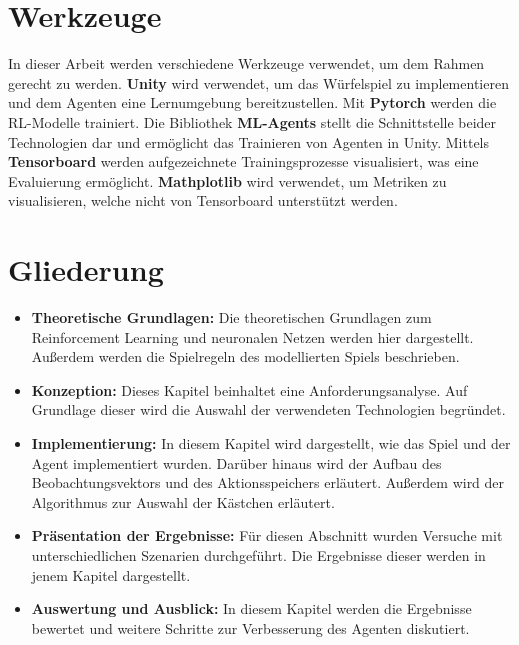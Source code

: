 \section{Werkzeuge}
In dieser Arbeit werden verschiedene Werkzeuge verwendet, um dem Rahmen gerecht zu werden.
\textbf{Unity} wird verwendet, um das Würfelspiel zu implementieren und dem Agenten eine Lernumgebung bereitzustellen. Mit \textbf{Pytorch} werden die RL-Modelle trainiert. Die Bibliothek \textbf  {ML-Agents} stellt die Schnittstelle beider Technologien dar und ermöglicht das Trainieren von Agenten in Unity. Mittels \textbf{Tensorboard} werden aufgezeichnete Trainingsprozesse visualisiert, was eine Evaluierung ermöglicht. \textbf{Mathplotlib} wird verwendet, um Metriken zu visualisieren, welche nicht von Tensorboard unterstützt werden.

\section{Gliederung}
\begin{itemize}[noitemsep]
\item \textbf{Theoretische Grundlagen:} Die theoretischen Grundlagen zum Reinforcement Learning und neuronalen Netzen werden hier dargestellt. Außerdem werden die Spielregeln des modellierten Spiels beschrieben.
\item \textbf{Konzeption:} Dieses Kapitel beinhaltet eine Anforderungsanalyse. Auf Grundlage dieser wird die Auswahl der verwendeten Technologien begründet.
\item \textbf{Implementierung:} In diesem Kapitel wird dargestellt, wie das Spiel und der Agent implementiert wurden. Darüber hinaus wird der Aufbau des Beobachtungsvektors und des Aktionsspeichers erläutert. Außerdem wird der Algorithmus zur Auswahl der Kästchen erläutert.
\item \textbf{Präsentation der Ergebnisse:} Für diesen Abschnitt wurden Versuche mit unterschiedlichen Szenarien durchgeführt. Die Ergebnisse dieser werden in jenem Kapitel dargestellt. 
\item \textbf{Auswertung und Ausblick:} In diesem Kapitel werden die Ergebnisse bewertet und weitere Schritte zur Verbesserung des Agenten diskutiert.
\end{itemize}